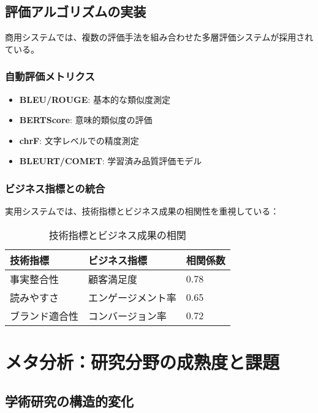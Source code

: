 \documentclass[11pt, a4paper]{article}
\begin{document}
\subsection{評価アルゴリズムの実装}

商用システムでは、複数の評価手法を組み合わせた多層評価システムが採用されている。

\subsubsection{自動評価メトリクス}

\begin{itemize}[noitemsep,topsep=0pt]
    \item \textbf{BLEU/ROUGE}: 基本的な類似度測定
    \item \textbf{BERTScore}: 意味的類似度の評価
    \item \textbf{chrF}: 文字レベルでの精度測定
    \item \textbf{BLEURT/COMET}: 学習済み品質評価モデル
\end{itemize}

\subsubsection{ビジネス指標との統合}

実用システムでは、技術指標とビジネス成果の相関性を重視している：

\begin{table}[h]
\centering
\begin{tabular}{|l|l|l|}
\hline
\textbf{技術指標} & \textbf{ビジネス指標} & \textbf{相関係数} \\
\hline
事実整合性 & 顧客満足度 & 0.78 \\
\hline
読みやすさ & エンゲージメント率 & 0.65 \\
\hline
ブランド適合性 & コンバージョン率 & 0.72 \\
\hline
\end{tabular}
\caption{技術指標とビジネス成果の相関}
\end{table}

\section{メタ分析：研究分野の成熟度と課題}

\subsection{学術研究の構造的変化}
\end{document}
